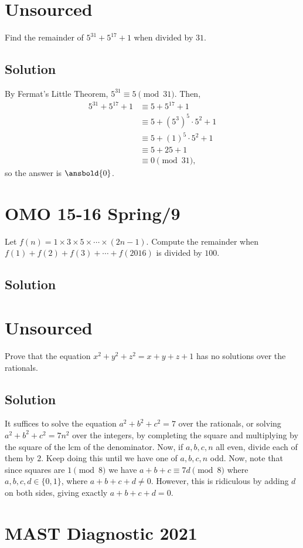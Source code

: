 \documentclass[mast]{lucky}
\begin{document}
\pagebreak\section{Unsourced}

Find the remainder of $5^{31}+5^{17}+1$ when divided by $31.$

\subsection{Solution}

By Fermat's Little Theorem, $5^{31} \equiv 5 \pmod{31}$. Then,
\begin{align*}
5^{31} + 5^{17} + 1 &\equiv 5 + 5^{17} + 1 \\
&\equiv 5 + (5^3)^5 \cdot 5^2 + 1 \\
&\equiv 5 + (1)^5 \cdot 5^2 + 1 \\
&\equiv 5 + 25 + 1 \\
&\equiv 0 \pmod{31},
\end{align*}
so the answer is $\ansbold{0}$.

\pagebreak\section{OMO 15-16 Spring/9}

Let $f(n)=1 \times 3 \times 5 \times \cdots \times (2n-1)$. Compute the remainder when $f(1)+f(2)+f(3)+\cdots +f(2016)$ is divided by $100.$

\subsection{Solution}

\pagebreak\section{Unsourced}

Prove that the equation $x^2+y^2+z^2=x+y+z+1$ has no solutions over the rationals.

\subsection{Solution}
It suffices to solve the equation $a^2 + b^2 + c^2 = 7$ over the rationals, or solving $a^2+b^2+c^2 = 7n^2$ over the integers, by completing the square and multiplying by the square of the lcm of the denominator. Now, if $a,b,c,n$ all even, divide each of them by $2$. Keep doing this until we have one of $a,b,c,n$ odd. Now, note that since squares are $1 \pmod{8}$ we have $a + b + c \equiv 7d \pmod{8}$ where $a,b,c,d \in \{0,1\}$, where $a+b+c+d \neq 0$. However, this is ridiculous by adding $d$ on both sides, giving exactly $a+b+c+d = 0$.
\pagebreak\section{MAST Diagnostic 2021}
\end{document}
